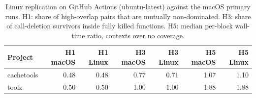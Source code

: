 \begin{table}[t]
\centering\small
\begin{tabular}{lrrrrrr}
\toprule
Project & H1 macOS & H1 Linux & H3 macOS & H3 Linux & H5 macOS & H5 Linux \\
\midrule
cachetools & 0.48 & 0.48 & 0.77 & 0.71 & 1.07 & 1.10 \\
toolz & 0.50 & 0.50 & 1.00 & 1.00 & 1.88 & 1.88 \\
\bottomrule
\end{tabular}
\caption{Linux replication on GitHub Actions (ubuntu-latest) against the macOS primary runs. H1: share of high-overlap pairs that are mutually non-dominated. H3: share of call-deletion survivors inside fully killed functions. H5: median per-block wall-time ratio, contexts over no coverage.}
\label{tab:replication}
\end{table}
